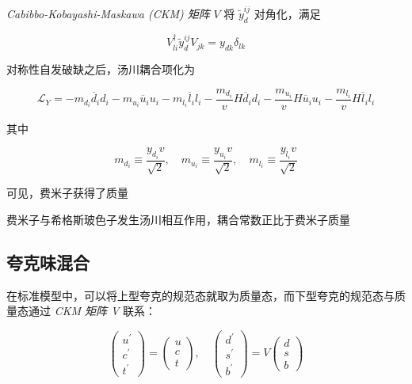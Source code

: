\emph{Cabibbo-Kobayashi-Maskawa (CKM) 矩阵} $V$ 将 $\tilde{y}_d^{ij}$ 对角化，满足

\begin{equation}
    V_{li}^\dagger \tilde{y}_d^{ij} V_{jk} = y_{dk} \delta_{lk}
\end{equation}

对称性自发破缺之后，汤川耦合项化为

\begin{equation}
    \mathcal{L}_Y = -m_{d_i} \overline{d}_i d_i - m_{u_i} \overline{u}_i u_i - m_{l_i} \overline{l}_i l_i - \frac{m_{d_i}}{v} H \overline{d}_i d_i - \frac{m_{u_i}}{v} H \overline{u}_i u_i - \frac{m_{l_i}}{v} H \overline{l}_i l_i
\end{equation}

其中

\begin{equation}
    m_{d_i} \equiv \frac{y_{d_i} v}{\sqrt{2}}, \quad m_{u_i} \equiv \frac{y_{u_i} v}{\sqrt{2}}, \quad m_{l_i} \equiv \frac{y_{l_i} v}{\sqrt{2}}
\end{equation}

可见，费米子获得了质量

费米子与希格斯玻色子发生汤川相互作用，耦合常数正比于费米子质量

\subsection{夸克味混合}

在标准模型中，可以将上型夸克的规范态就取为质量态，而下型夸克的规范态与质量态通过  \emph{CKM 矩阵 V} 联系：

\begin{equation}
    \begin{pmatrix}
        u^\prime \\
        c^\prime \\
        t^\prime
    \end{pmatrix} =
    \begin{pmatrix}
        u \\
        c \\
        t
    \end{pmatrix}, \quad
    \begin{pmatrix}
        d^\prime \\
        s^\prime \\
        b^\prime
    \end{pmatrix} = V
    \begin{pmatrix}
        d \\
        s \\
        b
    \end{pmatrix}
\end{equation}

